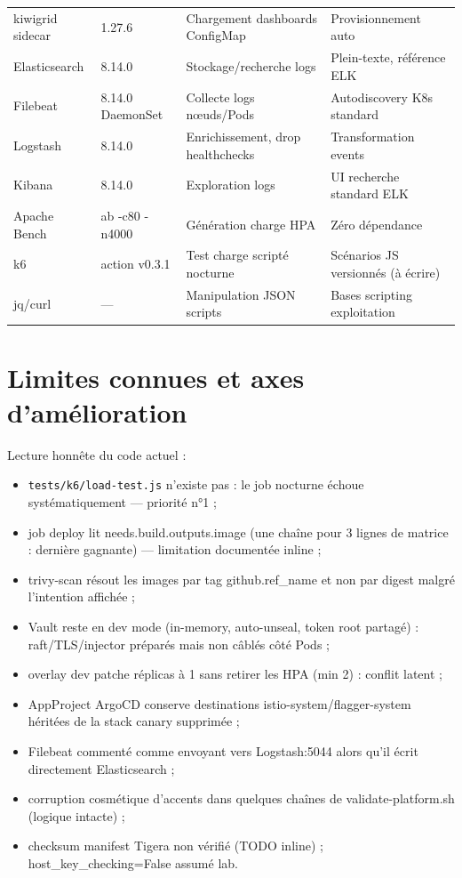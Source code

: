\documentclass[12pt,a4paper]{article}
\begin{document}
{\begin{longtable}{@{}p{3.0cm}p{1.9cm}p{4.7cm}p{4.7cm}@{}}
kiwigrid sidecar & 1.27.6 & Chargement dashboards ConfigMap & Provisionnement auto \\
Elasticsearch & 8.14.0 & Stockage/recherche logs & Plein-texte, référence ELK \\
Filebeat & 8.14.0 DaemonSet & Collecte logs nœuds/Pods & Autodiscovery K8s standard \\
Logstash & 8.14.0 & Enrichissement, drop healthchecks & Transformation events \\
Kibana & 8.14.0 & Exploration logs & UI recherche standard ELK \\
Apache Bench & ab -c80 -n4000 & Génération charge HPA & Zéro dépendance \\
k6 & action v0.3.1 & Test charge scripté nocturne & Scénarios JS versionnés (à écrire) \\
jq/curl & --- & Manipulation JSON scripts & Bases scripting exploitation \\
\bottomrule
\end{longtable}
}

\clearpage
\section{Limites connues et axes d'amélioration}

Lecture honnête du code actuel :
\begin{itemize}[itemsep=2pt]
  \item \texttt{tests/k6/load-test.js} n'existe pas : le job nocturne échoue systématiquement --- priorité n°1 ;
  \item job deploy lit needs.build.outputs.image (une chaîne pour 3 lignes de matrice : dernière gagnante) --- limitation documentée inline ;
  \item trivy-scan résout les images par tag github.ref\_name et non par digest malgré l'intention affichée ;
  \item Vault reste en dev mode (in-memory, auto-unseal, token root partagé) : raft/TLS/injector préparés mais non câblés côté Pods ;
  \item overlay dev patche réplicas à 1 sans retirer les HPA (min 2) : conflit latent ;
  \item AppProject ArgoCD conserve destinations istio-system/flagger-system héritées de la stack canary supprimée ;
  \item Filebeat commenté comme envoyant vers Logstash:5044 alors qu'il écrit directement Elasticsearch ;
  \item corruption cosmétique d'accents dans quelques chaînes de validate-platform.sh (logique intacte) ;
  \item checksum manifest Tigera non vérifié (TODO inline) ; host\_key\_checking=False assumé lab.
\end{itemize}
\end{document}

